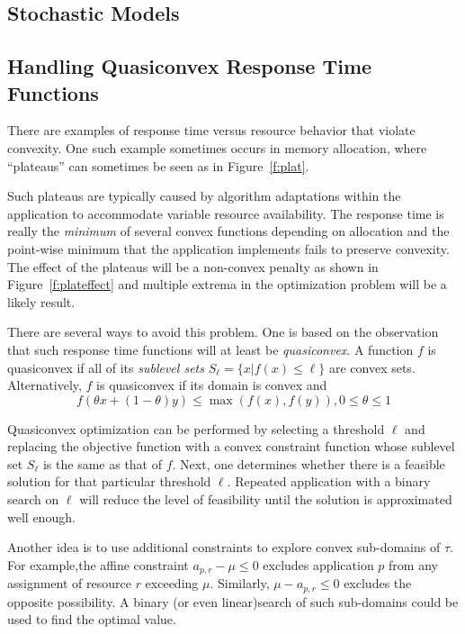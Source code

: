 \subsection{Stochastic Models}





\subsection{Handling Quasiconvex Response Time Functions}

There are examples of response time versus resource behavior that violate convexity.  One such example sometimes occurs in memory allocation, where ``plateaus'' can sometimes be seen as in Figure~\ref{f:plat}.

Such plateaus are typically caused by algorithm adaptations within the application to accommodate variable resource availability.  The response time is really the \emph{minimum} of several convex functions depending on allocation and the point-wise minimum that the application implements fails to preserve convexity.  The effect of the plateaus will be a non-convex penalty as shown in Figure~\ref{f:plateffect} and multiple extrema in the optimization problem will be a likely result.

There are several ways to avoid this problem.  One is based on the observation that such response time functions
will at least be \emph{quasiconvex}.  A function $f$ is quasiconvex if all of its \emph{sublevel sets}
$S_\ell = \{x | f(x) \leq \ell\}$ are convex sets.
Alternatively, $f$ is quasiconvex if its domain is convex and
\begin{displaymath}
f(\theta x + (1-\theta)y) \leq \max(f(x),f(y)), 0 \leq \theta \leq 1
\end{displaymath}

Quasiconvex optimization can be performed by selecting a threshold $\ell$ and replacing the objective function
with a convex constraint function whose sublevel set $S_\ell$ is the same as that of $f$.
Next, one determines whether there is a feasible solution for that particular threshold $\ell$.
Repeated application with a binary search on $\ell$ will reduce the level of feasibility
until the solution is approximated well enough.

Another idea is to use additional constraints to explore convex sub-domains of $\tau$.
For example,the affine constraint $a_{p,r} - \mu \leq 0$ excludes application $p$ from any assignment of resource $r$ exceeding $\mu$.  Similarly, $\mu - a_{p,r} \leq 0$ excludes the opposite possibility.
A binary (or even linear)search of such sub-domains could be used to find the optimal value.









